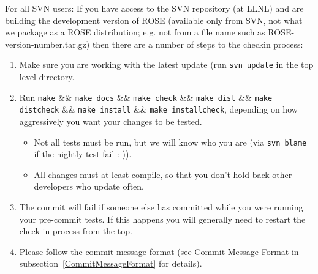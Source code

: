   For all SVN users:
    If you have access to the SVN repository (at LLNL) and are building the development 
    version of ROSE (available only from SVN, not what we package as a ROSE distribution; 
        e.g. not from a file name such as ROSE-version-number.tar.gz) then 
    there are a number of steps to the checkin process:
  \begin{enumerate}
  \item Make sure you are working with the latest update (run {\tt svn update} in the top
      level directory.


      \item Run {\tt make} \&\& {\tt make docs} \&\& {\tt make check} \&\&
      {\tt make dist} \&\& 
      {\tt make distcheck} \&\& {\tt make install} \&\& {\tt make installcheck}, depending
      on how aggressively you want your changes to be tested.
      \begin{itemize}
      \item Not all tests must be run, but we will know who you are (via {\tt svn blame} 
        if the nightly test fail :-)).
    \item All changes must at least compile, so that you don't hold back other
    developers who update often.
    \end{itemize}
  \item The commit will fail if someone else has committed while you were running
    your pre-commit tests. If this happens you will generally need to restart
    the check-in process from the top.
    \item Please follow the commit message format (see Commit Message Format in 
        subsection~\ref{CommitMessageFormat} for details).


\end{enumerate}
